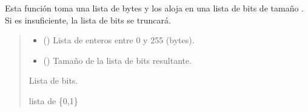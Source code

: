 \documentclass[letterpaper,10pt,english]{sphinxmanual}
\begin{document}
\begin{fulllineitems}
\label{\detokenize{fpga.interfaz_pcps:fpga.interfaz_pcps.bytestr_to_bitstr}}
\pysigstartsignatures
{}
\pysigstopsignatures
\sphinxAtStartPar
Esta función toma una lista de bytes  y los aloja en una lista de bits de tamaño . Si  es insuficiente, la lista de bits se truncará.
\begin{quote}\begin{description}
\begin{itemize}
\item {} 
\sphinxAtStartPar
{} () \textendash{} Lista de enteros entre 0 y 255 (bytes).

\item {} 
\sphinxAtStartPar
{} () \textendash{} Tamaño de la lista de bits resultante.

\end{itemize}

\sphinxAtStartPar
Lista de bits.

\sphinxAtStartPar
lista de \{0,1\}

\end{description}\end{quote}

\end{fulllineitems}

\end{document}
